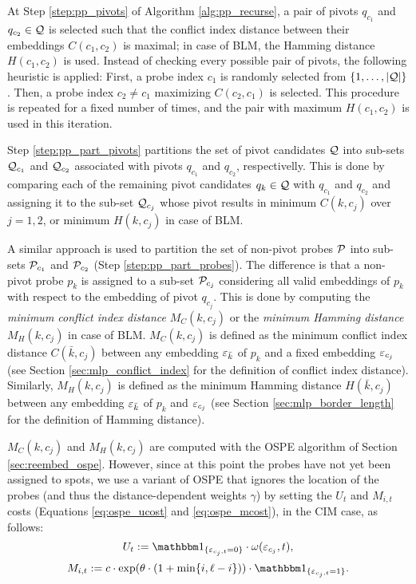 At Step \ref{step:pp_pivots} of Algorithm \ref{alg:pp_recurse}, a pair of pivots
$q_{c_1}$ and $q_{c_2} \in {\mathcal{Q}}$ is selected such that the conflict index
distance between their embeddings $C(c_1,c_2)$ is maximal; in case of BLM, the
Hamming distance $H(c_1,c_2)$ is used. Instead of checking every possible pair
of pivots, the following heuristic is applied: First, a probe index $c_1$ is
randomly selected from $\{1,\dots,|{\mathcal{Q}}|\}$. Then, a probe index $c_2\neq c_1$
maximizing $C(c_2,c_1)$ is selected. This procedure is repeated for a fixed
number of times, and the pair with maximum $H(c_1,c_2)$ is used in this
iteration.

Step \ref{step:pp_part_pivots} partitions the set of pivot candidates ${\mathcal{Q}}$
into sub-sets ${\mathcal{Q}}_{c_1}$ and ${\mathcal{Q}}_{c_2}$ associated with pivots $q_{c_1}$
and $q_{c_2}$, respectivelly. This is done by comparing each of the remaining
pivot candidates $q_k \in {\mathcal{Q}}$ with $q_{c_1}$ and $q_{c_2}$ and assigning it
to the sub-set ${\mathcal{Q}}_{c_j}$ whose pivot results in minimum $C(k,c_j)$ over
$j=1,2$, or minimum $H(k,c_j)$ in case of BLM.

A similar approach is used to partition the set of non-pivot probes ${\mathcal{P}}$ into
sub-sets ${\mathcal{P}}_{c_1}$ and ${\mathcal{P}}_{c_2}$ (Step \ref{step:pp_part_probes}). The
difference is that a non-pivot probe $p_k$ is assigned to a sub-set
${\mathcal{P}}_{c_j}$ considering all valid embeddings of $p_k$ with respect to the
embedding of pivot $q_{c_j}$. This is done by computing the \emph{minimum
conflict index distance} $M_C(k,c_j)$ or the \emph{minimum Hamming distance}
$M_H(k,c_j)$ in case of BLM. $M_C(k,c_j)$ is defined as the minimum conflict
index distance $C(\bar{k},c_j)$ between any embedding $\varepsilon_{\bar{k}}$ of $p_k$
and a fixed embedding $\varepsilon_{c_j}$ (see Section \ref{sec:mlp_conflict_index} for
the definition of conflict index distance). Similarly, $M_H(k,c_j)$ is defined
as the minimum Hamming distance $H(\bar{k},c_j)$ between any embedding
$\varepsilon_{\bar{k}}$ of $p_k$ and $\varepsilon_{c_j}$ (see Section
\ref{sec:mlp_border_length} for the definition of Hamming distance).

$M_C(k,c_j)$ and $M_H(k,c_j)$ are computed with the OSPE algorithm of Section
\ref{sec:reembed_ospe}. However, since at this point the probes have not yet
been assigned to spots, we use a variant of OSPE that ignores the location of
the probes (and thus the distance-dependent weights $\gamma$) by setting the
$U_t$ and $M_{i,t}$ costs (Equations \ref{eq:ospe_ucost} and
\ref{eq:ospe_mcost}), in the CIM case, as follows:
\[
U_t := \Ind{\eps_{c_j,t}=0} \cdot \omega(\eps_{c_j},t),
\]
\[
M_{i,t} := c \cdot \exp(\theta\cdot (1+\min\{i,\ell-i\})) \cdot \Ind{\eps_{c_j,t}=1}.
\]

